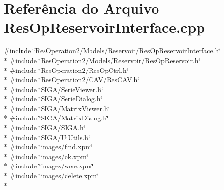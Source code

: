 \section{Referência do Arquivo Res\+Op\+Reservoir\+Interface.\+cpp}
\label{_res_op_reservoir_interface_8cpp}
{\ttfamily \#include \char`\"{}Res\+Operation2/\+Models/\+Reservoir/\+Res\+Op\+Reservoir\+Interface.\+h\char`\"{}}\\*
{\ttfamily \#include \char`\"{}Res\+Operation2/\+Models/\+Reservoir/\+Res\+Op\+Reservoir.\+h\char`\"{}}\\*
{\ttfamily \#include \char`\"{}Res\+Operation2/\+Res\+Op\+Ctrl.\+h\char`\"{}}\\*
{\ttfamily \#include \char`\"{}Res\+Operation2/\+C\+A\+V/\+Res\+C\+A\+V.\+h\char`\"{}}\\*
{\ttfamily \#include \char`\"{}S\+I\+G\+A/\+Serie\+Viewer.\+h\char`\"{}}\\*
{\ttfamily \#include \char`\"{}S\+I\+G\+A/\+Serie\+Dialog.\+h\char`\"{}}\\*
{\ttfamily \#include \char`\"{}S\+I\+G\+A/\+Matrix\+Viewer.\+h\char`\"{}}\\*
{\ttfamily \#include \char`\"{}S\+I\+G\+A/\+Matrix\+Dialog.\+h\char`\"{}}\\*
{\ttfamily \#include \char`\"{}S\+I\+G\+A/\+S\+I\+G\+A.\+h\char`\"{}}\\*
{\ttfamily \#include \char`\"{}S\+I\+G\+A/\+Ui\+Utils.\+h\char`\"{}}\\*
{\ttfamily \#include \char`\"{}images/find.\+xpm\char`\"{}}\\*
{\ttfamily \#include \char`\"{}images/ok.\+xpm\char`\"{}}\\*
{\ttfamily \#include \char`\"{}images/save.\+xpm\char`\"{}}\\*
{\ttfamily \#include \char`\"{}images/delete.\+xpm\char`\"{}}\\*
